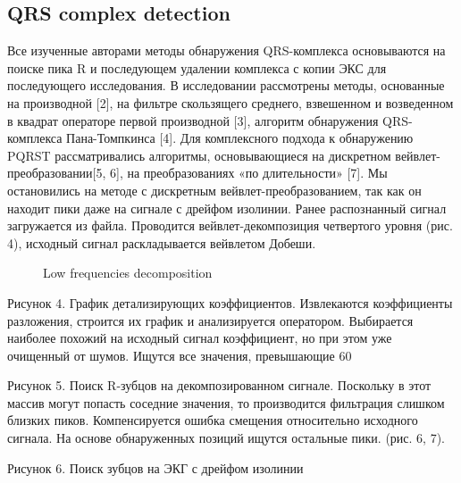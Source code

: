\documentclass[runningheads]{AIIT}
\begin{document}
\subsection{QRS complex detection}
\label{sec:qrs-compl-detect}

Все изученные авторами методы обнаружения QRS-комплекса основываются на поиске пика R и последующем удалении комплекса с копии ЭКС для последующего исследования. В исследовании рассмотрены методы, основанные на производной [2], на фильтре скользящего среднего, взвешенном и возведенном в квадрат операторе первой производной [3], алгоритм обнаружения QRS-комплекса Пана-Томпкинса [4]. Для комплексного подхода к обнаружению PQRST рассматривались алгоритмы, основывающиеся на дискретном вейвлет-преобразовании[5, 6], на преобразованиях «по длительности» [7].
Мы остановились на методе с дискретным вейвлет-преобразованием, так как он находит пики даже на сигнале с дрейфом изолинии.
Ранее распознанный сигнал загружается из файла. Проводится вейвлет-декомпозиция четвертого уровня (рис. 4), исходный сигнал раскладывается вейвлетом Добеши.


\begin{figure}[htb]
  \centering

  \caption{Low frequencies decomposition}
  \label{fig:decomp}
\end{figure}

Рисунок 4. График детализирующих коэффициентов.
Извлекаются коэффициенты разложения, строится их график и анализируется оператором. Выбирается наиболее похожий на исходный сигнал коэффициент, но при этом уже очищенный от шумов. Ищутся все значения, превышающие 60%

Рисунок 5. Поиск R-зубцов на декомпозированном сигнале.
Поскольку в этот массив могут попасть соседние значения, то производится фильтрация слишком близких пиков. Компенсируется ошибка смещения относительно исходного сигнала. На основе обнаруженных позиций ищутся остальные пики. (рис. 6, 7).

Рисунок 6. Поиск зубцов на ЭКГ с дрейфом изолинии
\end{document}
